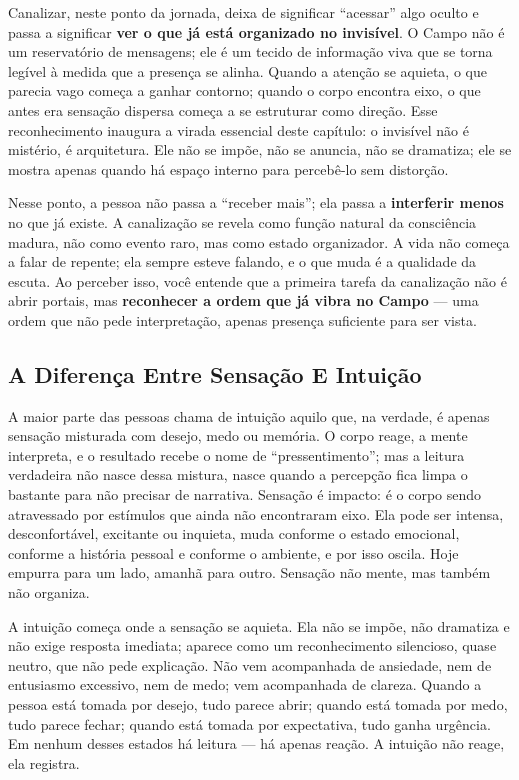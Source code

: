 \documentclass[12pt]{book}
\begin{document}
Canalizar, neste ponto da jornada, deixa de significar ``acessar'' algo oculto e passa a significar \textbf{ver o que já está organizado no invisível}. O Campo não é um reservatório de mensagens; ele é um tecido de informação viva que se torna legível à medida que a presença se alinha. Quando a atenção se aquieta, o que parecia vago começa a ganhar contorno; quando o corpo encontra eixo, o que antes era sensação dispersa começa a se estruturar como direção. Esse reconhecimento inaugura a virada essencial deste capítulo: o invisível não é mistério, é arquitetura. Ele não se impõe, não se anuncia, não se dramatiza; ele se mostra apenas quando há espaço interno para percebê-lo sem distorção.

Nesse ponto, a pessoa não passa a ``receber mais''; ela passa a \textbf{interferir menos} no que já existe. A canalização se revela como função natural da consciência madura, não como evento raro, mas como estado organizador. A vida não começa a falar de repente; ela sempre esteve falando, e o que muda é a qualidade da escuta. Ao perceber isso, você entende que a primeira tarefa da canalização não é abrir portais, mas \textbf{reconhecer a ordem que já vibra no Campo} --- uma ordem que não pede interpretação, apenas presença suficiente para ser vista.

\subsection*{A Diferença Entre Sensação E Intuição}

A maior parte das pessoas chama de intuição aquilo que, na verdade, é apenas sensação misturada com desejo, medo ou memória. O corpo reage, a mente interpreta, e o resultado recebe o nome de ``pressentimento''; mas a leitura verdadeira não nasce dessa mistura, nasce quando a percepção fica limpa o bastante para não precisar de narrativa. Sensação é impacto: é o corpo sendo atravessado por estímulos que ainda não encontraram eixo. Ela pode ser intensa, desconfortável, excitante ou inquieta, muda conforme o estado emocional, conforme a história pessoal e conforme o ambiente, e por isso oscila. Hoje empurra para um lado, amanhã para outro. Sensação não mente, mas também não organiza.

A intuição começa onde a sensação se aquieta. Ela não se impõe, não dramatiza e não exige resposta imediata; aparece como um reconhecimento silencioso, quase neutro, que não pede explicação. Não vem acompanhada de ansiedade, nem de entusiasmo excessivo, nem de medo; vem acompanhada de clareza. Quando a pessoa está tomada por desejo, tudo parece abrir; quando está tomada por medo, tudo parece fechar; quando está tomada por expectativa, tudo ganha urgência. Em nenhum desses estados há leitura --- há apenas reação. A intuição não reage, ela registra.
\end{document}
